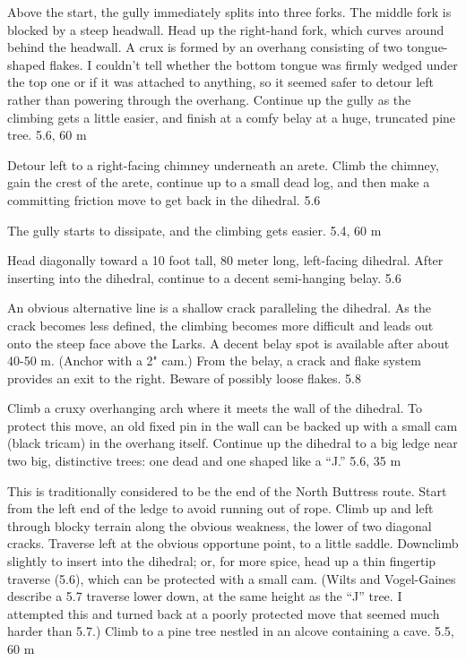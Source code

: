 \documentclass{tahquitz}
\begin{document}
 Above the start, the gully immediately splits into three
forks. The middle fork is blocked by a steep headwall.
Head up the right-hand fork, which curves around behind
the headwall. A crux is formed by an overhang consisting 
of two tongue-shaped flakes.
I couldn't tell whether the bottom tongue was firmly wedged under the top
one or if it was attached to anything, so it seemed safer to detour left
rather than powering through the overhang. Continue up the gully as the
climbing gets a little easier, and finish at a comfy belay at a huge,
truncated pine tree. 5.6, 60 m

  Detour left to a right-facing chimney underneath an arete.
Climb the chimney, gain the crest of the arete, continue up
to a small dead log, and then make a committing friction
move to get back in the dihedral. 5.6

 The gully starts to dissipate, and the climbing gets easier.
5.4, 60 m

 Head diagonally toward a 10 foot tall, 80 meter long, left-facing dihedral. After
inserting into the dihedral, continue to a decent semi-hanging belay. 5.6

 An obvious alternative line is a shallow crack paralleling the dihedral.
As the crack becomes less defined,
the climbing becomes more difficult and leads out onto the steep face above the Larks.
A decent belay spot is available after about 40-50 m. (Anchor with a 2" cam.)
From the belay, a crack and flake system provides an exit to the right. 
Beware of possibly loose flakes. 5.8

 Climb a cruxy overhanging arch where it meets the wall of the dihedral.
To protect this move, an old fixed pin in the wall can be backed up with
a small cam (black tricam) in the overhang itself.
Continue up the dihedral to a big ledge near two big, distinctive
trees: one dead and one shaped like a ``J.'' 5.6, 35 m


 This is traditionally considered to be the end of the
North Buttress route. Start from the left end of the ledge to avoid
running out of rope. Climb up and left through blocky terrain along the obvious weakness, the
lower of two diagonal cracks. Traverse left at the obvious opportune point, to a
little saddle. Downclimb slightly to insert into the dihedral; or, for more spice,
head up a thin fingertip traverse (5.6),
which can be protected with a small cam. (Wilts and Vogel-Gaines describe a 5.7 traverse lower
down, at the same height as the ``J'' tree. I attempted this and turned back at a poorly
protected move that seemed much harder than 5.7.)
Climb to a pine tree nestled in an alcove containing a cave. 5.5, 60 m
\end{document}
